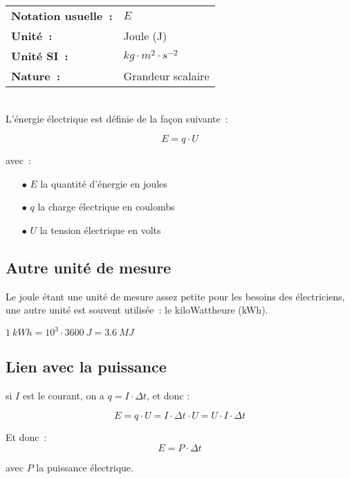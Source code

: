 \begin{tabular}{ll}
\textbf{Notation usuelle~:} & $E$ \\
\textbf{Unité~:} & Joule (J) \\
	\textbf{Unité SI~:} & $kg \cdot m^2 \cdot s^{-2}$ \\
\textbf{Nature~:} & Grandeur scalaire \\
\end{tabular} \\

L'énergie électrique est définie de la façon suivante~:

\begin{equation}
	E = q \cdot U
\end{equation}

avec~:
\begin{itemize}
	\item[$\bullet$] $E$ la quantité d'énergie en joules
	\item[$\bullet$] $q$ la charge électrique en coulombs
	\item[$\bullet$] $U$ la tension électrique en volts \\
\end{itemize}

\subsection{Autre unité de mesure}

Le joule étant une unité de mesure assez petite pour les besoins des électriciens, une autre unité est souvent utilisée~: le kiloWattheure (kWh). \\

$ 1\:kWh = 10^3 \cdot 3600\:J = 3.6\:MJ $


\subsection{Lien avec la puissance}

si $I$ est le courant, on a $q = I \cdot \Delta t$, et donc :

$$ E = q \cdot U = I \cdot \Delta t \cdot U = U \cdot I \cdot \Delta t $$

Et donc~: \\
\begin{equation}
E = P \cdot \Delta t 
\end{equation}

avec $P$ la puissance électrique.\\

